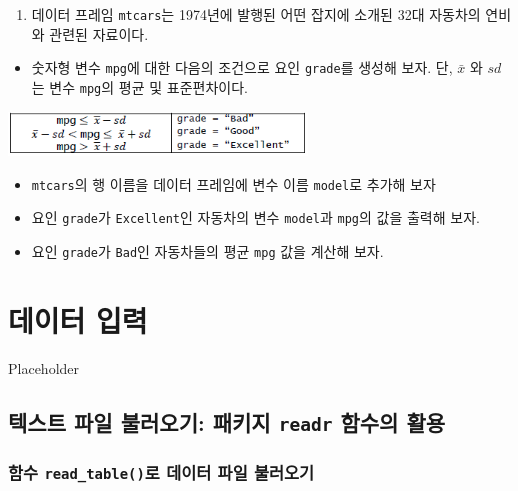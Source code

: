 \documentclass[
]{book}
\providecommand{\tightlist}{%
  \setlength{\itemsep}{0pt}\setlength{\parskip}{0pt}}
\begin{document}
\begin{enumerate}
\def\labelenumi{\arabic{enumi}.}
\setcounter{enumi}{1}
\tightlist
\item
  데이터 프레임 \texttt{mtcars}는 1974년에 발행된 어떤 잡지에 소개된 32대 자동차의 연비와 관련된 자료이다.
\end{enumerate}

\begin{itemize}
\tightlist
\item
  숫자형 변수 \texttt{mpg}에 대한 다음의 조건으로 요인 \texttt{grade}를 생성해 보자. 단, \(\bar{x}\) 와 \(sd\) 는 변수 \texttt{mpg}의 평균 및 표준편차이다.
\end{itemize}

\includegraphics[width=3.125in,height=\textheight]{Figure/ch2_ex_21_2.PNG}

\begin{itemize}
\item
  \texttt{mtcars}의 행 이름을 데이터 프레임에 변수 이름 \texttt{model}로 추가해 보자
\item
  요인 \texttt{grade}가 \texttt{Excellent}인 자동차의 변수 \texttt{model}과 \texttt{mpg}의 값을 출력해 보자.
\item
  요인 \texttt{grade}가 \texttt{Bad}인 자동차들의 평균 \texttt{mpg} 값을 계산해 보자.
\end{itemize}

\hypertarget{uxb370uxc774uxd130-uxc785uxb825}{%
\chapter{데이터 입력}\label{uxb370uxc774uxd130-uxc785uxb825}}

Placeholder

\hypertarget{uxd14duxc2a4uxd2b8-uxd30cuxc77c-uxbd88uxb7ecuxc624uxae30-uxd328uxd0a4uxc9c0-readr-uxd568uxc218uxc758-uxd65cuxc6a9}{%
\section{\texorpdfstring{텍스트 파일 불러오기: 패키지 \texttt{readr} 함수의 활용}{텍스트 파일 불러오기: 패키지 readr 함수의 활용}}\label{uxd14duxc2a4uxd2b8-uxd30cuxc77c-uxbd88uxb7ecuxc624uxae30-uxd328uxd0a4uxc9c0-readr-uxd568uxc218uxc758-uxd65cuxc6a9}}

\hypertarget{uxd568uxc218-read_tableuxb85c-uxb370uxc774uxd130-uxd30cuxc77c-uxbd88uxb7ecuxc624uxae30}{%
\subsection{\texorpdfstring{함수 \texttt{read\_table()}로 데이터 파일 불러오기}{함수 read\_table()로 데이터 파일 불러오기}}\label{uxd568uxc218-read_tableuxb85c-uxb370uxc774uxd130-uxd30cuxc77c-uxbd88uxb7ecuxc624uxae30}}
\end{document}
